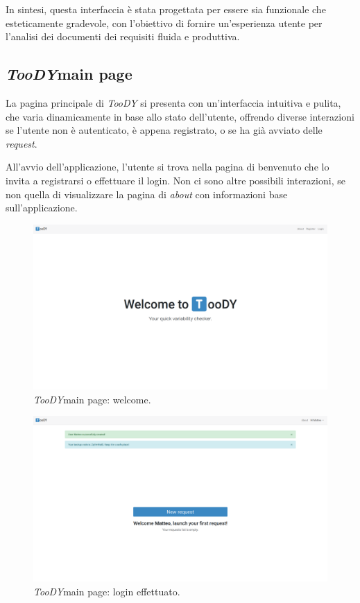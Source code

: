 \documentclass[12pt]{report}
\newcommand{\toody}{\textsl{TooDY}\xspace}
\begin{document}
In sintesi, questa interfaccia è stata progettata per essere sia funzionale che esteticamente gradevole, con l'obiettivo di fornire un'esperienza utente per l'analisi dei documenti dei requisiti fluida e produttiva.


\subsection{\toody \textsf{main page}}
La pagina principale di \toody si presenta con un'interfaccia intuitiva e pulita, che varia dinamicamente in base allo stato dell'utente, offrendo diverse interazioni se l'utente non è autenticato, è appena registrato, o se ha già avviato delle \textit{request}.

All'avvio dell'applicazione, l'utente si trova nella pagina di benvenuto che lo invita a registrarsi o effettuare il login. Non ci sono altre possibili interazioni, se non quella di visualizzare la pagina di \textit{about} con informazioni base sull'applicazione.

\begin{figure}[H]
\centering
\includegraphics[width=1.0\textwidth]{pagina1-welcome.png}
\caption{\toody \textsf{main page}: welcome.}
\label{fig:pagina1-login}
\end{figure}

\begin{figure}[H]
\centering
\includegraphics[width=1.0\textwidth]{pagina1-login.png}
\caption{\toody \textsf{main page}: login effettuato.}
\label{fig:pagina1-login}
\end{figure}
\end{document}
